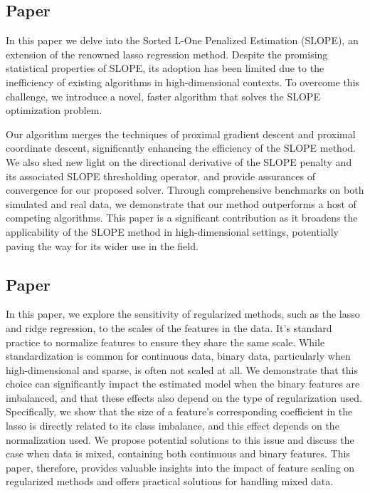 \documentclass{book}
\begin{document}
\subsection{Paper \V}

In this paper we delve into the Sorted L-One Penalized Estimation (SLOPE), an extension of the renowned lasso regression method. Despite the promising statistical properties of SLOPE, its adoption has been limited due to the inefficiency of existing algorithms in high-dimensional contexts. To overcome this challenge, we introduce a novel, faster algorithm that solves the SLOPE optimization problem.

Our algorithm merges the techniques of proximal gradient descent and proximal coordinate descent, significantly enhancing the efficiency of the SLOPE method. We also shed new light on the directional derivative of the SLOPE penalty and its associated SLOPE thresholding operator, and provide assurances of convergence for our proposed solver. Through comprehensive benchmarks on both simulated and real data, we demonstrate that our method outperforms a host of competing algorithms. This paper is a significant contribution as it broadens the applicability of the SLOPE method in high-dimensional settings, potentially paving the way for its wider use in the field.

\subsection{Paper \VI}

In this paper, we explore the sensitivity of regularized methods, such as the lasso and ridge regression, to the scales of the features in the data. It's standard practice to normalize features to ensure they share the same scale. While standardization is common for continuous data, binary data, particularly when high-dimensional and sparse, is often not scaled at all. We demonstrate that this choice can significantly impact the estimated model when the binary features are imbalanced, and that these effects also depend on the type of regularization used. Specifically, we show that the size of a feature's corresponding coefficient in the lasso is directly related to its class imbalance, and this effect depends on the normalization used. We propose potential solutions to this issue and discuss the case when data is mixed, containing both continuous and binary features. This paper, therefore, provides valuable insights into the impact of feature scaling on regularized methods and offers practical solutions for handling mixed data.
\end{document}
